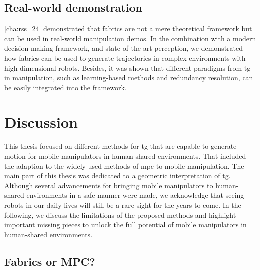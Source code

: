 \subsection{Real-world demonstration}
\label{sec:conclusion_real_world}

\cref{cha:rss_24} demonstrated that \ac{fabrics} are not a mere theoretical
framework but can be used in real-world manipulation demos. In the combination
with a modern decision making framework, and state-of-the-art perception, 
we demonstrated how \ac{fabrics} can be used to generate trajectories in complex
environments with high-dimensional robots. Besides, it was shown that different
paradigms from \ac{tg} in manipulation, such as learning-based methods and
redundancy resolution, can be easily integrated into the framework.


\section{Discussion}
\label{sec:discussion}

This thesis focused on different methods for \ac{tg} that are capable to
generate motion for mobile manipulators in human-shared environments. That
included the adaption to the widely used methods of \ac{mpc} to mobile
manipulation. The main part of this thesis was dedicated to a geometric
interpretation of \ac{tg}. Although several advancements for bringing mobile
manipulators to human-shared environments in a safe manner were made, we acknowledge
that seeing robots in our daily lives will still be a rare sight for the years
to come. In the following, we discuss the limitations of the proposed methods
and highlight important missing pieces to unlock the full potential of mobile
manipulators in human-shared environments.

\subsection{Fabrics or MPC?}
\label{sec:discussion_fabrics_or_mpc}

